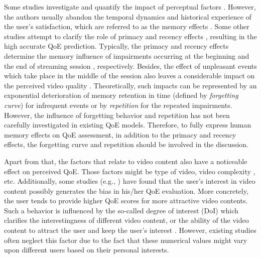 Some studies investigate and quantify the impact of perceptual factors \cite{QoEModel_OP_EstimatingQoE, QoEModel_OP_DerivingValidatingUserExperience, QoEModel_OP_VideoQualityMetric, QoEModel_TimeVaryingSubjectiveQuality, QoeModel_ShortLongTermQualityModel}.
However, the authors usually abandon the temporal dynamics and historical experience of the user's satisfaction, which are referred to as the memory effects \cite{MemoryEffects_WebQoE}.
Some other studies attempt to clarify the role of primacy and recency effects \cite{QoEModel_BitrateDistribution, QoEModel_OM_DistortionsRebuffMemory, QoEModel_NARX_DynamicNetworks, LFOVIA, QoEModel_TVQoE_ContinuousTimeQoE, QoEModel_NLSS, QoEModel_LSTM}, resulting in the high accurate QoE prediction.
Typically, the primacy and recency effects \cite{PrimacyVsRecency} determine the memory influence of impairments occurring at the beginning and the end of streaming session \cite{NetflixQoE}, respectively.
Besides, the effect of unpleasant events which take place in the middle of the session also leaves a considerable impact on the perceived video quality \cite{NetflixQoE,StallingEvents}.
Theoretically, such impacts can be represented by an exponential deterioration of memory retention in time (defined by \textit{forgetting curve}) \cite{UserForgetful, EvaluatingForgettingCurves, Ebbinghaus_ForgettingCurve} for infrequent events or by \textit{repetition} \cite{StallingEvents, Ebbinghaus_ForgettingCurve} for the repeated impairments.
However, the influence of forgetting behavior and repetition has not been carefully investigated in existing QoE models.
Therefore, to fully express human memory effects on QoE assessment, in addition to the primacy and recency effects, the forgetting curve and repetition should be involved in the discussion.


Apart from that, the factors that relate to video content also have a noticeable effect on perceived QoE. Those factors might be type of video, video complexity \cite{EffectSizesOfInfluenceFactors}, etc.
Additionally, some studies (e.g., \cite{QoSImpactUserVideoClips, SubjectiveQualityPairedComparison, QoEEvaluation_IPTV_Services}) have found that the user's interest in video content possibly generates the bias in his/her QoE evaluation.
More concretely, the user tends to provide higher QoE scores for more attractive video contents.
Such a behavior is influenced by the so-called degree of interest (DoI) which clarifies the interestingness of different video content, or the ability of the video content to attract the user and keep the user's interest \cite{VisualContent}.
However, existing studies often neglect this factor due to the fact that these numerical values might vary upon different users based on their personal interests.



